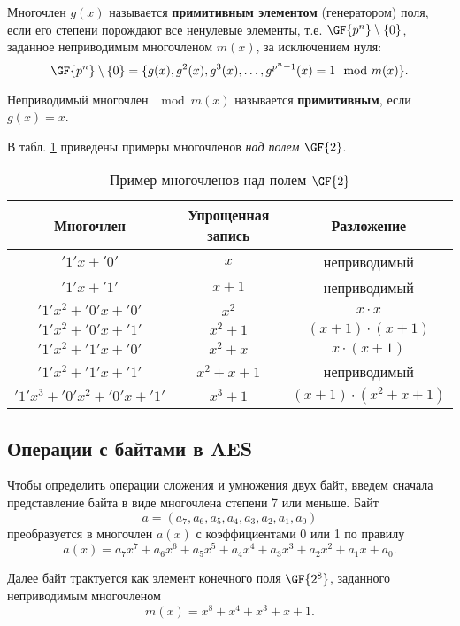 Многочлен $g(x)$ называется \textbf{примитивным элементом} (генератором) поля, если его степени порождают все ненулевые элементы, т.е. $\GF{p^n} \setminus \{0\}$, заданное неприводимым многочленом $m(x)$, за исключением нуля:
    \[ \GF{p^n} \setminus \{0\} = \{ g(x), g^2(x), g^3(x), \dots, g^{p^n-1}(x) = 1 \mod m(x) \}. \]

Неприводимый многочлен $\mod m(x)$ называется  \textbf{примитивным}, если $g(x)=x$.

\example
В табл. \ref{tab:irreducible-gf2} приведены примеры многочленов \emph{над полем} $\GF{2}$.
\begin{table}[!ht]
    \centering
    \caption{Пример многочленов над полем $\GF{2}$\label{tab:irreducible-gf2}}
    \begin{tabular}{|c|c|c|}
        \hline
        Многочлен & \parbox{2.5cm}{Упрощенная запись} & Разложение \\
        \hline
        $'1' x + '0'$ & $x$ & неприводимый \\
        $'1' x + '1'$ & $x+1$ & неприводимый \\
        $'1' x^2 + '0' x + '0'$ & $x^2$ & $x \cdot x$ \\
        $'1' x^2 + '0'x + '1'$ & $x^2 + 1$ & $(x+1) \cdot (x+1)$ \\
        $'1' x^2 + '1' x + '0'$ & $x^2 + x$ & $x \cdot (x+1)$ \\
        $'1' x^2 + '1' x + '1'$ & $x^2 + x + 1$ & неприводимый \\
        $'1' x^3 + '0' x^2 + '0' x + '1'$ & $x^3 + 1$ & $(x+1) \cdot (x^2+x+1)$ \\
        \hline
    \end{tabular}
\end{table}
\exampleend


\subsection{Операции с байтами в AES}

Чтобы определить операции сложения и умножения двух байт, введем сначала представление байта в виде многочлена степени 7 или меньше. Байт
    \[ a =( a_7, a_6, a_5, a_4, a_3, a_2, a_1, a_0) \]
преобразуется в многочлен $a(x)$ с коэффициентами 0 или 1 по правилу
    \[ a(x) = a_{7}x^{7}+a_{6}x^{6}+a_{5}x^{5}+a_{4}x^{4}+a_{3}x^{3}+a_{2}x^{2}+a_{1}x+a_{0}. \]

Далее байт трактуется как элемент конечного поля $\GF{2^8}$, заданного неприводимым многочленом
    \[ m(x) = x^{8}+x^{4}+x^{3}+x +1. \]

